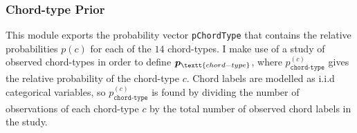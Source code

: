 \documentclass[12pt,a4paper,twoside,openany]{report} \usepackage[pdfborder={0 0 0}]{hyperref}    %
\theoremstyle{definition} \newtheorem{definition}{Definition}[section]
\begin{document}


    \subsubsection{Chord-type Prior}

    This module exports the probability vector \texttt{pChordType} that contains the relative probabilities $p(c)$ for each of the
    $14$ chord-types. I make use of a study of observed chord-types \cite{finkensiepChordTypesOrnamentation2023} in order to define
    $\bm{p}_{\textt{chord-type}}$, where $p^{(c)}_{\texttt{chord-type}}$ gives the relative probability of the
    chord-type $c$. Chord labels are modelled as i.i.d categorical variables, so $p^{(c)}_{\texttt{chord-type}}$ is
    found by dividing the number of observations of each chord-type $c$ by the total number of observed
    chord labels in the study. 
\end{document}

